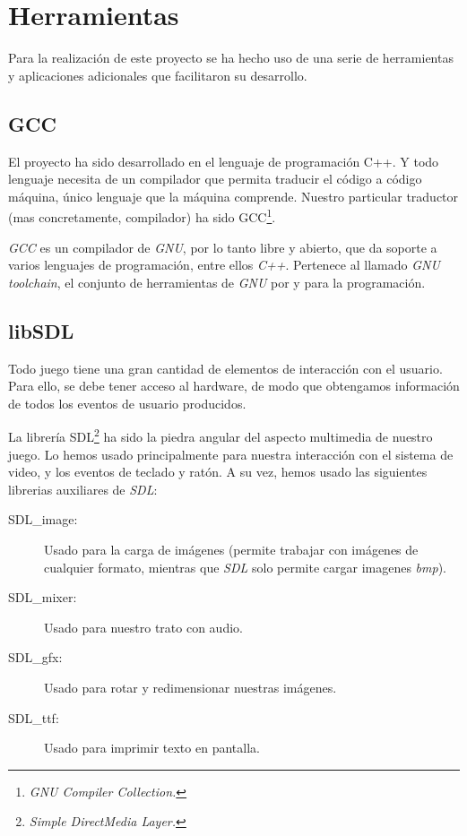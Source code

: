 %


\section{Herramientas}
\label{sec:herramientas}

Para la realización de este proyecto se ha hecho uso de una serie de
herramientas y aplicaciones adicionales que facilitaron su desarrollo.

\subsection{GCC}
El proyecto ha sido desarrollado en el lenguaje de programación C++. Y
todo lenguaje necesita de un compilador que permita traducir el código
a código máquina, único lenguaje que la máquina comprende. Nuestro
particular traductor (mas concretamente, compilador) ha sido
GCC\footnote{\emph{GNU Compiler Collection.}}.

\emph{GCC} es un compilador de \emph{GNU}, por lo tanto libre y
abierto, que da soporte a varios lenguajes de programación, entre
ellos \emph{C++}. Pertenece al llamado \emph{GNU toolchain}, el
conjunto de herramientas de \emph{GNU} por y para la programación.
 
\subsection{libSDL}
Todo juego tiene una gran cantidad de elementos de interacción con el
usuario. Para ello, se debe tener acceso al hardware, de modo que
obtengamos información de todos los eventos de usuario producidos.

La librería SDL\footnote{\emph{Simple DirectMedia Layer.}} ha sido la
piedra angular del aspecto multimedia de nuestro juego. Lo hemos usado
principalmente para nuestra interacción con el sistema de video, y los eventos de teclado y
ratón. A su vez, hemos usado las siguientes librerias auxiliares de
\emph{SDL}:
\begin{description}
\item[SDL\_image:] Usado para la carga de imágenes (permite trabajar con
  imágenes de cualquier formato, mientras que \emph{SDL} solo permite
  cargar imagenes \emph{bmp}).
\item[SDL\_mixer:] Usado para nuestro trato con audio.
\item[SDL\_gfx:] Usado para rotar y redimensionar nuestras imágenes.
\item[SDL\_ttf:] Usado para imprimir texto en pantalla.
\end{description}


